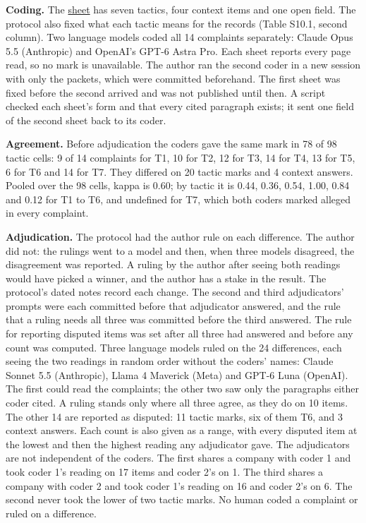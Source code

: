 \documentclass[
  11pt,
]{article}
\begin{document}
\textbf{Coding.} The \href{tools/complaint_audit/SHEET.md}{sheet} has
seven tactics, four context items and one open field. The protocol also
fixed what each tactic means for the records (Table S10.1, second
column). Two language models coded all 14 complaints separately: Claude
Opus 5.5 (Anthropic) and OpenAI's \mbox{GPT-6} Astra Pro. Each sheet
reports every page read, so no mark is unavailable. The author ran the
second coder in a new session with only the packets, which were
committed beforehand. The first sheet was fixed before the second
arrived and was not published until then. A script checked each sheet's
form and that every cited paragraph exists; it sent one field of the
second sheet back to its coder.

\textbf{Agreement.} Before adjudication the coders gave the same mark in
78 of 98 tactic cells: 9 of 14 complaints for T1, 10 for T2, 12 for T3,
14 for T4, 13 for T5, 6 for T6 and 14 for T7. They differed on 20 tactic
marks and 4 context answers. Pooled over the 98 cells, kappa is 0.60; by
tactic it is 0.44, 0.36, 0.54, 1.00, 0.84 and 0.12 for T1 to T6, and
undefined for T7, which both coders marked alleged in every complaint.

\textbf{Adjudication.} The protocol had the author rule on each
difference. The author did not: the rulings went to a model and then,
when three models disagreed, the disagreement was reported. A ruling by
the author after seeing both readings would have picked a winner, and
the author has a stake in the result. The protocol's dated notes record
each change. The second and third adjudicators' prompts were each
committed before that adjudicator answered, and the rule that a ruling
needs all three was committed before the third answered. The rule for
reporting disputed items was set after all three had answered and before
any count was computed. Three language models ruled on the 24
differences, each seeing the two readings in random order without the
coders' names: Claude Sonnet 5.5 (Anthropic), Llama 4 Maverick (Meta)
and \mbox{GPT-6} Luna (OpenAI). The first could read the complaints; the
other two saw only the paragraphs either coder cited. A ruling stands
only where all three agree, as they do on 10 items. The other 14 are
reported as disputed: 11 tactic marks, six of them T6, and 3 context
answers. Each count is also given as a range, with every disputed item
at the lowest and then the highest reading any adjudicator gave. The
adjudicators are not independent of the coders. The first shares a
company with coder 1 and took coder 1's reading on 17 items and coder
2's on 1. The third shares a company with coder 2 and took coder 1's
reading on 16 and coder 2's on 6. The second never took the lower of two
tactic marks. No human coded a complaint or ruled on a difference.
\end{document}
